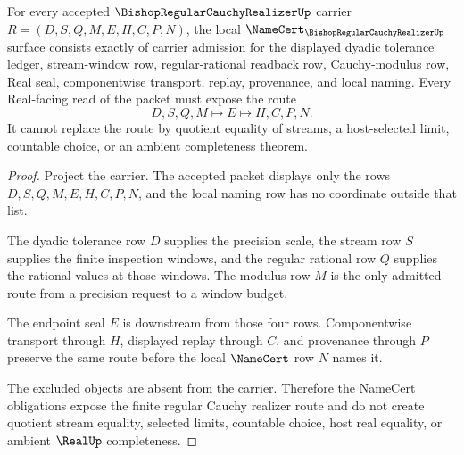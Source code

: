 \begin{theorem}
\label{thm:bishop-regular-cauchy-realizer-namecert-obligations}
For every accepted $\BishopRegularCauchyRealizerUp$ carrier $R=(D,S,Q,M,E,H,C,P,N)$, the local $\NameCert_{\BishopRegularCauchyRealizerUp}$ surface consists exactly of carrier admission for the displayed dyadic tolerance ledger, stream-window row, regular-rational readback row, Cauchy-modulus row, Real seal, componentwise transport, replay, provenance, and local naming. Every Real-facing read of the packet must expose the route
$$
D,S,Q,M \longmapsto E \longmapsto H,C,P,N .
$$
It cannot replace the route by quotient equality of streams, a host-selected limit, countable choice, or an ambient completeness theorem.
\end{theorem}
\begin{proof}
Project the carrier. The accepted packet displays only the rows $D,S,Q,M,E,H,C,P,N$, and the local naming row has no coordinate outside that list.

The dyadic tolerance row $D$ supplies the precision scale, the stream row $S$ supplies the finite inspection windows, and the regular rational row $Q$ supplies the rational values at those windows. The modulus row $M$ is the only admitted route from a precision request to a window budget.

The endpoint seal $E$ is downstream from those four rows. Componentwise transport through $H$, displayed replay through $C$, and provenance through $P$ preserve the same route before the local $\NameCert$ row $N$ names it.

The excluded objects are absent from the carrier. Therefore the NameCert obligations expose the finite regular Cauchy realizer route and do not create quotient stream equality, selected limits, countable choice, host real equality, or ambient $\RealUp$ completeness.
\end{proof}


